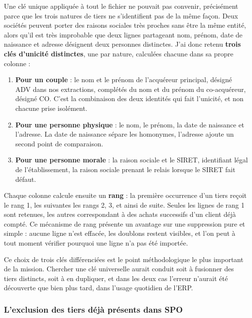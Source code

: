 Une clé unique appliquée à tout le fichier ne pouvait pas convenir, précisément parce que les
trois natures de tiers ne s'identifient pas de la même façon. Deux sociétés peuvent porter des
raisons sociales très proches sans être la même entité, alors qu'il est très improbable que
deux lignes partageant nom, prénom, date de naissance et adresse désignent deux personnes
distinctes. J'ai donc retenu \textbf{trois clés d'unicité distinctes}, une par nature, calculées
chacune dans sa propre colonne :

\begin{enumerate}
\def\labelenumi{\arabic{enumi}.}

\item
  \textbf{Pour un couple} : le nom et le prénom de l'acquéreur principal, désigné ADV dans nos
  extractions, complétés du nom et du prénom du co-acquéreur, désigné CO. C'est la combinaison
  des deux identités qui fait l'unicité, et non chacune prise isolément.
\item
  \textbf{Pour une personne physique} : le nom, le prénom, la date de naissance et l'adresse. La
  date de naissance sépare les homonymes, l'adresse ajoute un second point de comparaison.
\item
  \textbf{Pour une personne morale} : la raison sociale et le SIRET, identifiant légal de
  l'établissement, la raison sociale prenant le relais lorsque le SIRET fait défaut.
\end{enumerate}

Chaque colonne calcule ensuite un \textbf{rang} : la première occurrence d'un tiers reçoit le
rang 1, les suivantes les rangs 2, 3, et ainsi de suite. Seules les lignes de rang 1 sont
retenues, les autres correspondant à des achats successifs d'un client déjà compté. Ce
mécanisme de rang présente un avantage sur une suppression pure et simple : aucune ligne n'est
effacée, les doublons restent visibles, et l'on peut à tout moment vérifier pourquoi une ligne
n'a pas été importée.

Ce choix de trois clés différenciées est le point méthodologique le plus important de la
mission. Chercher une clé universelle aurait conduit soit à fusionner des tiers distincts, soit
à en dupliquer, et dans les deux cas l'erreur n'aurait été découverte que bien plus tard, dans
l'usage quotidien de l'ERP.

\subsubsection{L'exclusion des tiers déjà présents dans SPO}

